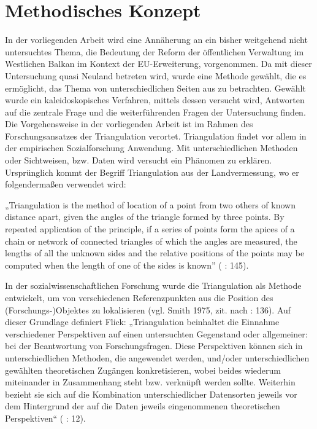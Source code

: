 \section{Methodisches Konzept}
In der vorliegenden Arbeit wird eine Annäherung an ein bisher weitgehend nicht untersuchtes Thema, die Bedeutung der Reform der öffentlichen Verwaltung im Westlichen Balkan im Kontext der EU-Erweiterung, vorgenommen. Da mit dieser Untersuchung quasi Neuland betreten wird, wurde eine Methode gewählt, die es ermöglicht, das Thema von unterschiedlichen Seiten aus zu betrachten. Gewählt wurde ein kaleidoskopisches Verfahren, mittels dessen versucht wird, Antworten auf die zentrale Frage und die weiterführenden Fragen der Untersuchung finden. Die Vorgehensweise in der vorliegenden Arbeit ist im Rahmen des Forschungsansatzes der Triangulation verortet. Triangulation findet vor allem in der empirischen Sozialforschung Anwendung. Mit unterschiedlichen Methoden oder Sichtweisen, bzw. Daten wird versucht ein Phänomen zu erklären. Ursprünglich kommt der Begriff Triangulation aus der Landvermessung, wo er folgendermaßen verwendet wird:\par
„Triangulation is the method of location of a point from two others of known distance apart, given the angles of the triangle formed by three points. By repeated application of the principle, if a series of points form the apices of a chain or network of connected triangles of which the angles are measured, the lengths of all the unknown sides and the relative positions of the points may be computed when the length of one of the sides is known” (\cite{clark} : 145).\par
In der sozialwissenschaftlichen Forschung wurde die Triangulation als Methode entwickelt, um von verschiedenen Referenzpunkten aus die Position des (Forschungs-)Objektes zu lokalisieren (vgl. Smith 1975, zit. nach \cite{jick} : 136). Auf dieser Grundlage definiert Flick: „Triangulation beinhaltet die Einnahme verschiedener Perspektiven auf einen untersuchten Gegenstand oder allgemeiner: bei der Beantwortung von Forschungsfragen. Diese Perspektiven können sich in unterschiedlichen Methoden, die angewendet werden, und/oder unterschiedlichen gewählten theoretischen Zugängen konkretisieren, wobei beides wiederum miteinander in Zusammenhang steht bzw. verknüpft werden sollte. Weiterhin bezieht sie sich auf die Kombination unterschiedlicher Datensorten jeweils vor dem Hintergrund der auf die Daten jeweils eingenommenen theoretischen Perspektiven“ (\cite{flick08} : 12).\par
